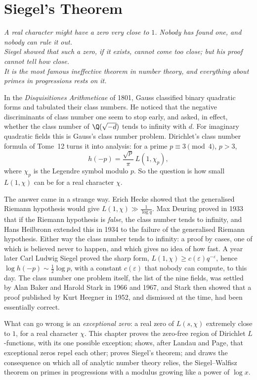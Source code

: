 \chapter{Siegel's Theorem}
\begin{center}\itshape
A real character might have a zero very close to $1$. Nobody has found one, and nobody can rule it out.\\
Siegel showed that such a zero, if it exists, cannot come too close; but his proof cannot tell how close.\\
It is the most famous ineffective theorem in number theory, and everything about primes in progressions rests on it.
\end{center}

In the \emph{Disquisitiones Arithmeticae} of 1801, Gauss classified binary quadratic forms and tabulated their class numbers. He noticed that the negative discriminants of class number one seem to stop early, and asked, in effect, whether the class number of $\Q(\sqrt{-d})$ tends to infinity with $d$. For imaginary quadratic fields this is
Gauss's class number problem. Dirichlet's class number formula of Tome~12 turns it into analysis: for a prime $p\equiv3\pmod4$, $p>3$,
\[
h(-p)=\frac{\sqrt p}\pi\,L(1,\chi_p),
\]
where $\chi_p$ is the Legendre symbol modulo $p$. So the question is how small $L(1,\chi)$ can be for a real character $\chi$.

The answer came in a strange way. Erich Hecke showed that the generalised Riemann hypothesis would give $L(1,\chi)\gg\frac1{\log q}$. Max Deuring proved in 1933 that if the Riemann hypothesis is \emph{false}, the class number tends to infinity, and Hans Heilbronn extended this in 1934 to the failure of the generalised Riemann
hypothesis. Either way the class number tends to infinity: a proof by cases, one of which is believed never to happen, and which gives no idea of how fast. A year later Carl Ludwig Siegel proved the sharp form, $L(1,\chi)\ge c(\varepsilon)q^{-\varepsilon}$, hence $\log h(-p)\sim\frac12\log p$, with a constant $c(\varepsilon)$ that nobody can compute, to this day.
The class number one problem itself, the list of the nine fields, was settled by Alan Baker and Harold Stark in 1966 and 1967, and Stark then showed that a proof published by Kurt Heegner in 1952, and dismissed at the time, had been essentially correct.

What can go wrong is an \emph{exceptional zero}: a real zero of $L(s,\chi)$ extremely close to $1$, for a real character $\chi$. This chapter proves the zero-free region of Dirichlet $L$-functions, with its one possible exception; shows, after Landau and Page, that exceptional zeros repel each other; proves Siegel's theorem; and draws the consequence
on which all of analytic number theory relies, the Siegel--Walfisz theorem on primes in progressions with a modulus growing like a power of $\log x$.

